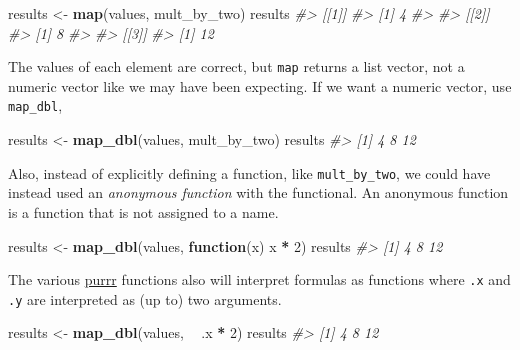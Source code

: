 \documentclass[]{book}
\newenvironment{Shaded}{\begin{snugshade}}{\end{snugshade}}
\newcommand{\CommentTok}[1]{\textcolor[rgb]{0.56,0.35,0.01}{\textit{#1}}}
\newcommand{\ControlFlowTok}[1]{\textcolor[rgb]{0.13,0.29,0.53}{\textbf{#1}}}
\newcommand{\DecValTok}[1]{\textcolor[rgb]{0.00,0.00,0.81}{#1}}
\newcommand{\KeywordTok}[1]{\textcolor[rgb]{0.13,0.29,0.53}{\textbf{#1}}}
\newcommand{\NormalTok}[1]{#1}
\newcommand{\OperatorTok}[1]{\textcolor[rgb]{0.81,0.36,0.00}{\textbf{#1}}}
\newcommand{\StringTok}[1]{\textcolor[rgb]{0.31,0.60,0.02}{#1}}
\theoremstyle{definition}
\theoremstyle{definition}
\theoremstyle{definition}
\theoremstyle{remark}
\begin{document}
\begin{Shaded}
\begin{Highlighting}[]
\NormalTok{results <-}\StringTok{ }\KeywordTok{map}\NormalTok{(values, mult_by_two)}
\NormalTok{results}
\CommentTok{#> [[1]]}
\CommentTok{#> [1] 4}
\CommentTok{#> }
\CommentTok{#> [[2]]}
\CommentTok{#> [1] 8}
\CommentTok{#> }
\CommentTok{#> [[3]]}
\CommentTok{#> [1] 12}
\end{Highlighting}
\end{Shaded}

The values of each element are correct, but \texttt{map} returns a list
vector, not a numeric vector like we may have been expecting. If we want
a numeric vector, use \texttt{map\_dbl},

\begin{Shaded}
\begin{Highlighting}[]
\NormalTok{results <-}\StringTok{ }\KeywordTok{map_dbl}\NormalTok{(values, mult_by_two)}
\NormalTok{results}
\CommentTok{#> [1]  4  8 12}
\end{Highlighting}
\end{Shaded}

Also, instead of explicitly defining a function, like
\texttt{mult\_by\_two}, we could have instead used an \emph{anonymous
function} with the functional. An anonymous function is a function that
is not assigned to a name.

\begin{Shaded}
\begin{Highlighting}[]
\NormalTok{results <-}\StringTok{ }\KeywordTok{map_dbl}\NormalTok{(values, }\ControlFlowTok{function}\NormalTok{(x) x }\OperatorTok{*}\StringTok{ }\DecValTok{2}\NormalTok{)}
\NormalTok{results}
\CommentTok{#> [1]  4  8 12}
\end{Highlighting}
\end{Shaded}

The various \href{https://cran.r-project.org/package=purrr}{purrr}
functions also will interpret formulas as functions where \texttt{.x}
and \texttt{.y} are interpreted as (up to) two arguments.

\begin{Shaded}
\begin{Highlighting}[]
\NormalTok{results <-}\StringTok{ }\KeywordTok{map_dbl}\NormalTok{(values, }\OperatorTok{~}\StringTok{ }\NormalTok{.x }\OperatorTok{*}\StringTok{ }\DecValTok{2}\NormalTok{)}
\NormalTok{results}
\CommentTok{#> [1]  4  8 12}
\end{Highlighting}
\end{Shaded}
\end{document}
